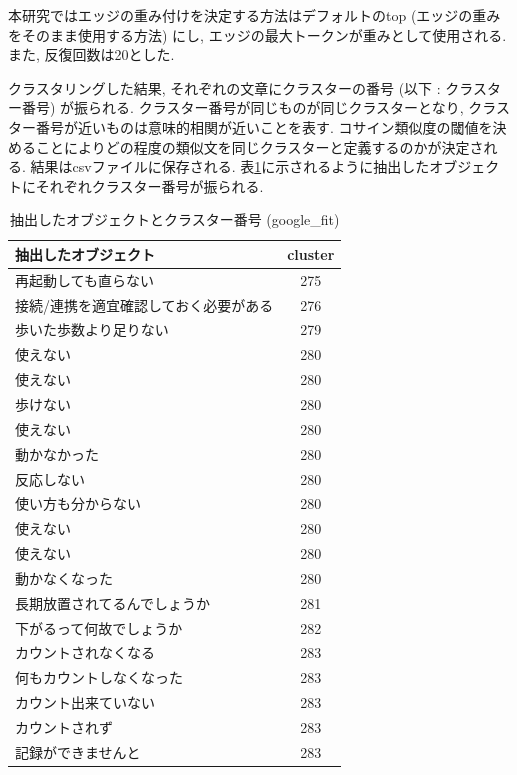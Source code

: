 本研究ではエッジの重み付けを決定する方法はデフォルトのtop (エッジの重みをそのまま使用する方法) にし, エッジの最大トークンが重みとして使用される. また, 反復回数は20とした. 

クラスタリングした結果, それぞれの文章にクラスターの番号 (以下 : クラスター番号) が振られる. クラスター番号が同じものが同じクラスターとなり, クラスター番号が近いものは意味的相関が近いことを表す. コサイン類似度の閾値を決めることによりどの程度の類似文を同じクラスターと定義するのかが決定される. 
結果はcsvファイルに保存される. 表\ref{tb:clustering}に示されるように抽出したオブジェクトにそれぞれクラスター番号が振られる. 

\begin{table}[H]
  \caption{抽出したオブジェクトとクラスター番号 (google\_fit) }
  \label{tb:clustering}
  \begin{center}
  \begin{tabularx}{\linewidth}{X|c}
    \hline
    抽出したオブジェクト&cluster\\\hline\hline
    再起動しても直らない&275\\\hline
    接続/連携を適宜確認しておく必要がある&276\\\hline
    歩いた歩数より足りない&279\\\hline
    使えない&280\\\hline
    使えない&280\\\hline
    歩けない&280\\\hline
    使えない&280\\\hline
    動かなかった&280\\\hline
    反応しない&280\\\hline
    使い方も分からない&280\\\hline
    使えない&280\\\hline
    使えない&280\\\hline
    動かなくなった&280\\\hline
    長期放置されてるんでしょうか&281\\\hline
    下がるって何故でしょうか&282\\\hline
    カウントされなくなる&283\\\hline
    何もカウントしなくなった&283\\\hline
    カウント出来ていない&283\\\hline
    カウントされず&283\\\hline
    記録ができませんと&283\\\hline
  \end{tabularx}\end{center}
\end{table}


